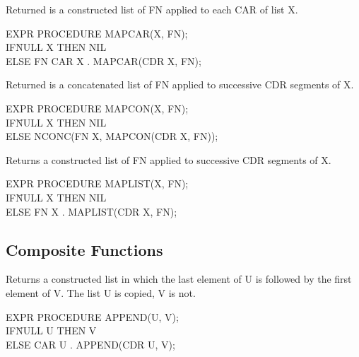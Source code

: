 {Returned is a constructed list of FN applied to each CAR of list X.

{\tt \begin{tabbing} EXPR PROCEDURE MAPCAR(X, FN); \\
\hspace*{1em} IF\= NULL X THEN NIL \\
\> ELSE FN CAR X . MAPCAR(CDR X, FN);
\end{tabbing}}}


{Returned is a concatenated list of FN applied to successive CDR
segments of X.

{\tt \begin{tabbing} EXPR PROCEDURE MAPCON(X, FN); \\
\hspace*{1em} IF\= NULL X THEN NIL \\
\> ELSE NCONC(FN X, MAPCON(CDR X, FN));
\end{tabbing}}}


{Returns a constructed list of FN applied to successive CDR segments
of X.

{\tt \begin{tabbing} EXPR PROCEDURE MAPLIST(X, FN); \\
\hspace*{1em} IF\= NULL X THEN NIL \\
\> ELSE FN X . MAPLIST(CDR X, FN);
\end{tabbing}}}


\subsection{Composite Functions}

{Returns a constructed list in which the last element of U is followed
by the first element of V. The list U is copied, V is not.

{\tt \begin{tabbing} EXPR PROCEDURE APPEND(U, V); \\
\hspace*{1em} IF\= NULL U THEN V \\
\> ELSE CAR U . APPEND(CDR U, V);
\end{tabbing}}}

